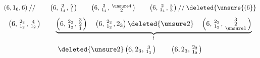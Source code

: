 \[
\left(6,1_6,6\right)\mathbin{//}\qquad \left(6,\begin{smallmatrix}2\\1_4\end{smallmatrix},\begin{smallmatrix}5\\1\end{smallmatrix}\right)\qquad \left(6,\begin{smallmatrix}2\\1_4\end{smallmatrix},\begin{smallmatrix}\unsure4\\2\end{smallmatrix}\right)\qquad \left(6,\begin{smallmatrix}2\\1_4\end{smallmatrix},\begin{smallmatrix}3\\3\end{smallmatrix}\right)\mathbin{//}\deleted{\unsure{(6}}
\]
\[
\left(6,\begin{smallmatrix}2_2\\1_2\end{smallmatrix},\begin{smallmatrix}4\\1_2\end{smallmatrix}\right)\qquad \underbrace{\left(6,\begin{smallmatrix}2_2\\1_2\end{smallmatrix},\begin{smallmatrix}3\\2\\1\end{smallmatrix}\right)\quad\left(6,\begin{smallmatrix}2_2\\1_2\end{smallmatrix},2_3\right)\deleted{\unsure2}\quad\left(6,\begin{smallmatrix}2_2\\1_2\end{smallmatrix},\begin{smallmatrix}3\\2\\\unsure1\end{smallmatrix}\right)}_{!}
\]
\[
\deleted{\unsure2}\left(6,2_3,\begin{smallmatrix}3\\1_3\end{smallmatrix}\right)\qquad \left(6,2_3,\begin{smallmatrix}2_2\\1_2\end{smallmatrix}\right)
\]

